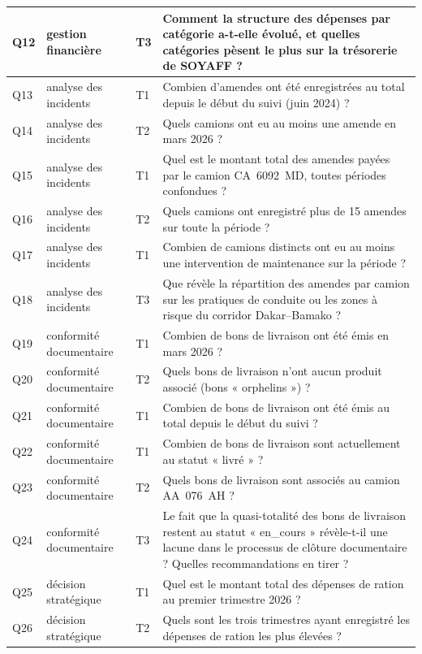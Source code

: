 \begin{longtable}{|>{\raggedright\arraybackslash}p{0.9cm}|>{\raggedright\arraybackslash}p{2.7cm}|>{\raggedright\arraybackslash}p{0.9cm}|>{\raggedright\arraybackslash}p{9.2cm}|}
Q12 & gestion financière & T3 & Comment la structure des dépenses par catégorie a-t-elle évolué, et quelles catégories pèsent le plus sur la trésorerie de SOYAFF ? \\ \hline
Q13 & analyse des incidents & T1 & Combien d'amendes ont été enregistrées au total depuis le début du suivi (juin 2024) ? \\ \hline
Q14 & analyse des incidents & T2 & Quels camions ont eu au moins une amende en mars 2026 ? \\ \hline
Q15 & analyse des incidents & T1 & Quel est le montant total des amendes payées par le camion CA~6092~MD, toutes périodes confondues ? \\ \hline
Q16 & analyse des incidents & T2 & Quels camions ont enregistré plus de 15 amendes sur toute la période ? \\ \hline
Q17 & analyse des incidents & T1 & Combien de camions distincts ont eu au moins une intervention de maintenance sur la période ? \\ \hline
Q18 & analyse des incidents & T3 & Que révèle la répartition des amendes par camion sur les pratiques de conduite ou les zones à risque du corridor Dakar--Bamako ? \\ \hline
Q19 & conformité documentaire & T1 & Combien de bons de livraison ont été émis en mars 2026 ? \\ \hline
Q20 & conformité documentaire & T2 & Quels bons de livraison n'ont aucun produit associé (bons « orphelins ») ? \\ \hline
Q21 & conformité documentaire & T1 & Combien de bons de livraison ont été émis au total depuis le début du suivi ? \\ \hline
Q22 & conformité documentaire & T1 & Combien de bons de livraison sont actuellement au statut « livré » ? \\ \hline
Q23 & conformité documentaire & T2 & Quels bons de livraison sont associés au camion AA~076~AH ? \\ \hline
Q24 & conformité documentaire & T3 & Le fait que la quasi-totalité des bons de livraison restent au statut « en\_cours » révèle-t-il une lacune dans le processus de clôture documentaire ? Quelles recommandations en tirer ? \\ \hline
Q25 & décision stratégique & T1 & Quel est le montant total des dépenses de ration au premier trimestre 2026 ? \\ \hline
Q26 & décision stratégique & T2 & Quels sont les trois trimestres ayant enregistré les dépenses de ration les plus élevées ? \\ \hline

\end{longtable}
